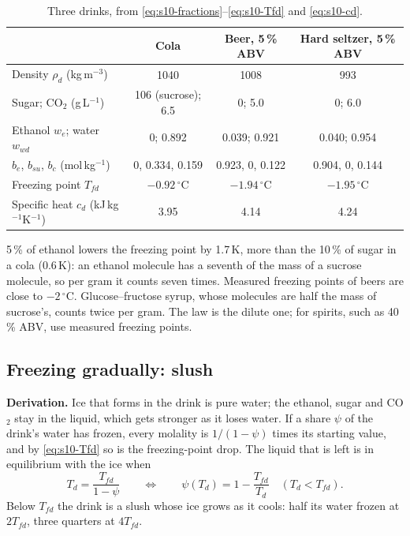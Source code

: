 \documentclass[11pt,a4paper]{article}
\newcommand{\dC}{\,{}^{\circ}\mathrm{C}}
\newcommand{\Tfd}{T_{fd}}
\newcommand{\para}[1]{\par\smallskip\noindent\textbf{#1}\enspace}
\begin{document}
\begin{table}[ht]
\centering\small
\caption{Three drinks, from \eqref{eq:s10-fractions}--\eqref{eq:s10-Tfd} and \eqref{eq:s10-cd}.}
\label{tab:drinks}
\begin{tabular}{@{}lccc@{}}
\toprule
 & Cola & Beer, 5\,\% ABV & Hard seltzer, 5\,\% ABV\\
\midrule
Density $\rho_d$ (kg\,m$^{-3}$) & 1040 & 1008 & 993\\
Sugar; CO$_2$ (g\,L$^{-1}$) & 106 (sucrose); 6.5 & 0; 5.0 & 0; 6.0\\
Ethanol $w_e$; water $w_{wd}$ & 0; 0.892 & 0.039; 0.921 & 0.040; 0.954\\
$b_e$, $b_{su}$, $b_c$ (mol\,kg$^{-1}$) & 0, 0.334, 0.159 & 0.923, 0, 0.122 & 0.904, 0, 0.144\\
Freezing point $\Tfd$ & $-0.92\dC$ & $-1.94\dC$ & $-1.95\dC$\\
Specific heat $c_d$ (kJ\,kg$^{-1}$K$^{-1}$) & 3.95 & 4.14 & 4.24\\
\bottomrule
\end{tabular}
\end{table}

5\,\% of ethanol lowers the freezing point by 1.7\,K, more than the 10\,\% of sugar in a cola (0.6\,K): an
ethanol molecule has a seventh of the mass of a sucrose molecule, so per gram it counts seven times. Measured
freezing points of beers are close to $-2\dC$. Glucose--fructose syrup, whose molecules are half the mass of
sucrose's, counts twice per gram. The law is the dilute one; for spirits, such as 40\,\% ABV, use measured
freezing points.

\subsection{Freezing gradually: slush}
\para{Derivation.} Ice that forms in the drink is pure water; the ethanol, sugar and CO$_2$ stay in the
liquid, which gets stronger as it loses water. If a share $\psi$ of the drink's water has frozen, every
molality is $1/(1 - \psi)$ times its starting value, and by \eqref{eq:s10-Tfd} so is the freezing-point drop.
The liquid that is left is in equilibrium with the ice when
\begin{equation}
T_d = \frac{\Tfd}{1 - \psi}\qquad\Longleftrightarrow\qquad \psi(T_d) = 1 - \frac{\Tfd}{T_d}\quad (T_d < \Tfd). \label{eq:s10-psi}
\end{equation}
Below $\Tfd$ the drink is a slush whose ice grows as it cools: half its water frozen at $2\Tfd$, three
quarters at $4\Tfd$.
\end{document}
